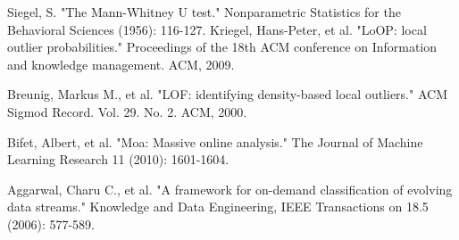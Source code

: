\documentclass[12pt,a4paper,oneside]{report}
\begin{document}
\begin{thebibliography}{20}
Siegel, S. "The Mann-Whitney U test." Nonparametric Statistics for the Behavioral Sciences (1956): 116-127.
Kriegel, Hans-Peter, et al. "LoOP: local outlier probabilities." Proceedings of the 18th ACM conference on Information and knowledge management. ACM, 2009.

Breunig, Markus M., et al. "LOF: identifying density-based local outliers." ACM Sigmod Record. Vol. 29. No. 2. ACM, 2000.

Bifet, Albert, et al. "Moa: Massive online analysis." The Journal of Machine Learning Research 11 (2010): 1601-1604.

Aggarwal, Charu C., et al. "A framework for on-demand classification of evolving data streams." Knowledge and Data Engineering, IEEE Transactions on 18.5 (2006): 577-589.

\end{thebibliography}
\end{document}
